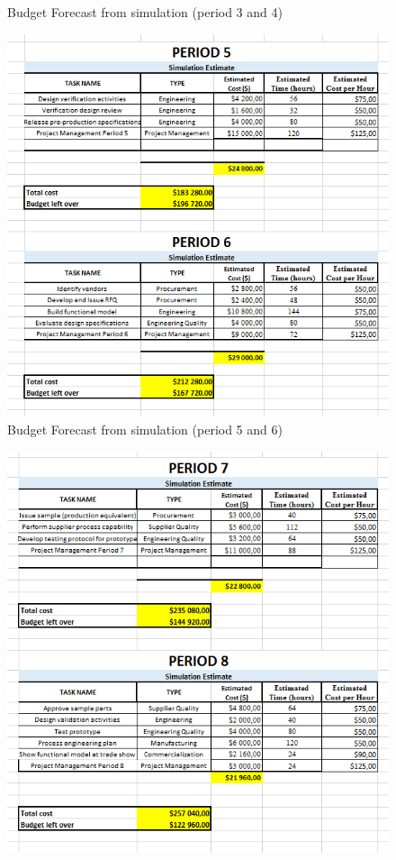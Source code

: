 \begin{appendices}
\begin{figure}[H]
\caption{Budget Forecast from simulation (period 3 and 4)}
\end{figure}
\begin{figure}[H]
\includegraphics[scale=1]{budget_forecast_sim_56.PNG}
\caption{Budget Forecast from simulation (period 5 and 6)}
\end{figure}
\begin{figure}[H]
\includegraphics[scale=1]{budget_forecast_sim_78.PNG}

\end{figure}
\end{appendices}
